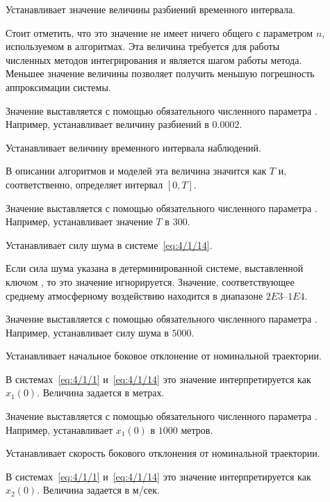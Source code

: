 \begin{description}
	\item[]
		Устанавливает значение величины разбиений временного интервала.
		
		Стоит отметить, что это значение не имеет ничего общего с параметром $n$, используемом в алгоритмах. Эта величина требуется для работы численных методов интегрирования и является шагом работы метода. Меньшее значение величины позволяет получить меньшую погрешность аппроксимации системы.
		
		Значение выставляется с помощью обязательного численного параметра . Например,  устанавливает величину разбиений в $0.0002$.
		
	\item[]
		Устанавливает величину временного интервала наблюдений.
		
		В описании алгоритмов и моделей эта величина значится как $T$ и, соответственно, определяет интервал $[0,T]$.
		
		Значение выставляется с помощью обязательного численного параметра . Например,  устанавливает значение $T$ в $300$.
		
	\item[]
		Устанавливает силу шума в системе~\ref{eq:4/1/14}.
		
		Если сила шума указана в детерминированной системе, выставленной ключом , то это значение игнорируется. Значение, соответствующее среднему атмосферному воздействию находится в диапазоне $2E3$--$1E4$.
		
		Значение выставляется с помощью обязательного численного параметра . Например,  устанавливает силу шума в $5000$.
		
	\item[]
		Устанавливает начальное боковое отклонение от номинальной траектории.
		
		В системах~\ref{eq:4/1/1} и~\ref{eq:4/1/14} это значение интерпретируется как $x_1(0)$. Величина задается в метрах.
		
		Значение выставляется с помощью обязательного численного параметра . Например,  устанавливает $x_1(0)$ в $1000$ метров.
		
	\item[]
		Устанавливает скорость бокового отклонения от номинальной траектории.
		
		В системах~\ref{eq:4/1/1} и~\ref{eq:4/1/14} это значение интерпретируется как $x_2(0)$. Величина задается в м/сек.
		

\end{description}
